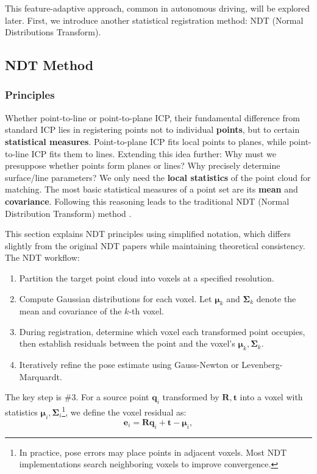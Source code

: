This feature-adaptive approach, common in autonomous driving, will be explored later. First, we introduce another statistical registration method: NDT (Normal Distributions Transform).

\subsection{NDT Method}
\label{sec:ndt}
\subsubsection{Principles}
Whether point-to-line or point-to-plane ICP, their fundamental difference from standard ICP lies in registering points not to individual \textbf{points}, but to certain \textbf{statistical measures}. Point-to-plane ICP fits local points to planes, while point-to-line ICP fits them to lines. Extending this idea further: Why must we presuppose whether points form planes or lines? Why precisely determine surface/line parameters? We only need the \textbf{local statistics} of the point cloud for matching. The most basic statistical measures of a point set are its \textbf{mean} and \textbf{covariance}. Following this reasoning leads to the traditional NDT (Normal Distribution Transform) method \cite{Ulas2013,Saarinen2013}.

This section explains NDT principles using simplified notation, which differs slightly from the original NDT papers while maintaining theoretical consistency. The NDT workflow:

\begin{enumerate}
	\item Partition the target point cloud into voxels at a specified resolution.
	\item Compute Gaussian distributions for each voxel. Let $\boldsymbol{\mu}_k$ and $\boldsymbol{\Sigma}_k$ denote the mean and covariance of the $k$-th voxel.
	\item During registration, determine which voxel each transformed point occupies, then establish residuals between the point and the voxel's $\boldsymbol{\mu}_k, \boldsymbol{\Sigma}_k$.
	\item Iteratively refine the pose estimate using Gauss-Newton or Levenberg-Marquardt.
\end{enumerate}

The key step is \#3. For a source point $\bm{q}_i$ transformed by $\bm{R}, \bm{t}$ into a voxel with statistics $\boldsymbol{\mu}_i, \boldsymbol{\Sigma}_i$\footnote{In practice, pose errors may place points in adjacent voxels. Most NDT implementations search neighboring voxels to improve convergence.}, we define the voxel residual as:
\begin{equation}\label{key}
	\bm{e}_i = \bm{R} \bm{q}_i + \bm{t} - \boldsymbol{\mu}_i,
\end{equation}

